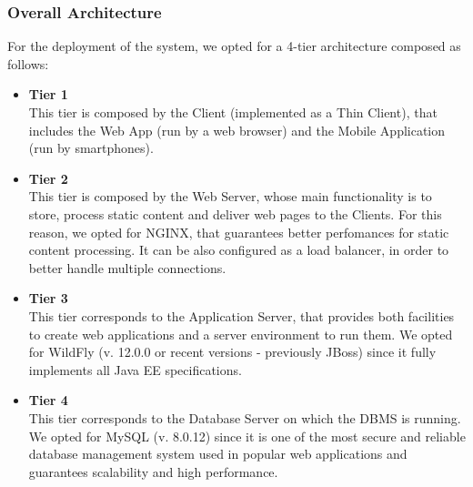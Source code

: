 \documentclass[12pt,a4paper]{article}
\begin{document}
	\subsubsection{Overall Architecture}
	For the deployment of the system, we opted for a 4-tier architecture composed as follows:
	\begin{itemize}
		\item \textbf{Tier 1}\\
		This tier is composed by the Client (implemented as a Thin Client), that includes the Web App (run by a web browser) and the Mobile Application (run by smartphones). 
		\item \textbf{Tier 2}\\
		This tier is composed by the Web Server, whose main functionality is to store, process static content and deliver web pages to the Clients. For this reason, we opted for NGINX, that guarantees better perfomances for static content processing. It can be also configured as a load balancer, in order to better handle multiple connections.
		\item \textbf{Tier 3}\\
		This tier corresponds to the Application Server, that provides both facilities to create web applications and a server environment to run them. We opted for WildFly (v. 12.0.0 or recent versions - previously JBoss) since it fully implements all Java EE specifications.
		\item \textbf{Tier 4}\\
		This tier corresponds to the Database Server on which the DBMS is running. We opted for MySQL (v. 8.0.12) since it is one of the most secure and reliable database management system used in popular web applications and guarantees scalability and high performance.
	\end{itemize}
\end{document}
